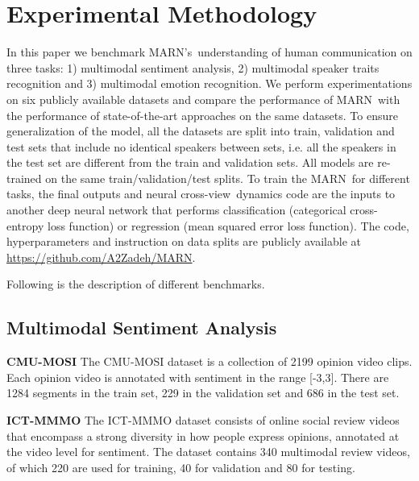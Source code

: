 \documentclass[letterpaper]{article} \usepackage{aaai18}  \usepackage{times}  \usepackage{helvet}  \usepackage{courier}  \usepackage{url}  \usepackage{graphicx}  \usepackage{multirow}
\newcommand{\pipelines}{MARN}
\newcommand{\inter}{cross-view}
\begin{document}
\iffalse
\subsection{Classification Network} The final outputs and attended outputs  and  are the inputs to another deep neural network that performs classification or regression depending on the chosen task. Depending on the training the network loss is either categorical cross-entropy (classification) or the Mean Square Error (regression). 

\fi


\section{Experimental Methodology}
In this paper we benchmark \pipelines 's\ understanding of human communication on three tasks: 1) multimodal sentiment analysis, 2) multimodal speaker traits recognition and 3) multimodal emotion recognition. We perform experimentations on six publicly available datasets and compare the performance of \pipelines \ with the performance of state-of-the-art approaches on the same datasets. To ensure generalization of the model, all the datasets are split into train, validation and test sets that include no identical speakers between sets, i.e. all the speakers in the test set are different from the train and validation sets. All models are re-trained on the same train/validation/test splits. To train the \pipelines \ for different tasks, the final outputs  and neural \inter \ dynamics code  are the inputs to another deep neural network that performs classification (categorical cross-entropy loss function) or regression (mean squared error loss function). The code, hyperparameters and instruction on data splits are publicly available at \url{https://github.com/A2Zadeh/MARN}. 

Following is the description of different benchmarks.  
\subsection{Multimodal Sentiment Analysis}
\quad \textbf{CMU-MOSI} The CMU-MOSI dataset \cite{zadeh2016multimodal} is a collection of 2199 opinion video clips. Each opinion video is annotated with sentiment in the range [-3,3]. There are 1284 segments in the train set, 229 in the validation set and 686 in the test set.

\textbf{ICT-MMMO} The ICT-MMMO dataset \cite{wollmer2013youtube} consists of online social review videos that encompass a strong diversity in how people express opinions, annotated at the video level for sentiment. The dataset contains 340 multimodal review videos, of which 220 are used for training, 40 for validation and 80 for testing.
\end{document}
